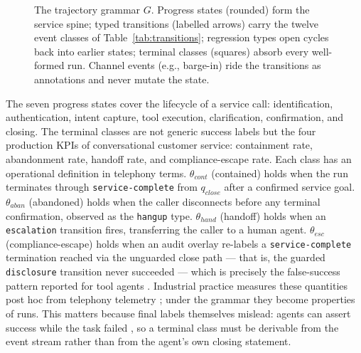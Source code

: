 \begin{figure}[t]
  \centering
  \resizebox{\linewidth}{!}{%
  }
  \caption{The trajectory grammar $G$.
           Progress states (rounded) form the service spine; typed transitions (labelled
           arrows) carry the twelve event classes of Table~\ref{tab:transitions};
           regression types open cycles back into earlier states;
           terminal classes (squares) absorb every well-formed run.
           Channel events (e.g., barge-in) ride the transitions as annotations and
           never mutate the state.}
  \label{fig:grammar}
\end{figure}

The seven progress states cover the lifecycle of a service call: identification, authentication,
intent capture, tool execution, clarification, confirmation, and closing.
The terminal classes are not generic success labels but the four production KPIs of conversational
customer service: containment rate, abandonment rate, handoff rate, and compliance-escape rate.
Each class has an operational definition in telephony terms.
$\theta_{cont}$ (contained) holds when the run terminates through \texttt{service-complete}
from $q_{close}$ after a confirmed service goal.
$\theta_{aban}$ (abandoned) holds when the caller disconnects before any terminal confirmation,
observed as the \texttt{hangup} type.
$\theta_{hand}$ (handoff) holds when an \texttt{escalation} transition fires, transferring the
caller to a human agent.
$\theta_{esc}$ (compliance-escape) holds when an audit overlay re-labels a \texttt{service-complete}
termination reached via the unguarded close path --- that is, the guarded \texttt{disclosure}
transition never succeeded --- which is precisely the false-success pattern reported for tool
agents \citep{falsesuccess2026}.
Industrial practice measures these quantities post hoc from telephony telemetry
\citep{nubank2026,silentabandonment2024}; under the grammar they become properties of runs.
This matters because final labels themselves mislead: agents can assert success while the task
failed \citep{falsesuccess2026}, so a terminal class must be derivable from the event stream
rather than from the agent's own closing statement.

